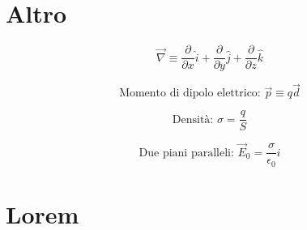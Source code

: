 \documentclass[a4paper,11pt]{article}
\begin{document}
\begin{multicols}{3}
		
		
		\section{Altro}
		
		\begin{equation}
			\vec{\nabla} \equiv
			\frac{\partial}{\partial x}\hat{i} +
			\frac{\partial}{\partial y}\hat{j} +
			\frac{\partial}{\partial z}\hat{k}
		\end{equation}
		
		\begin{equation}
			\text{Momento di dipolo elettrico: }\vec{p} \equiv q \vec{d}
		\end{equation}
		
		\begin{equation}
			\text{Densità: } \sigma = \frac{q}{S}
		\end{equation}
		
		\begin{equation}
			\text{Due piani paralleli: }\vec{E}_0 = \frac{\sigma}{\epsilon_0} \hat{i}
		\end{equation}
		
		
		
		
		
		\section{Lorem}
		\lipsum[1-10]
	\end{multicols}
	
\end{document}
